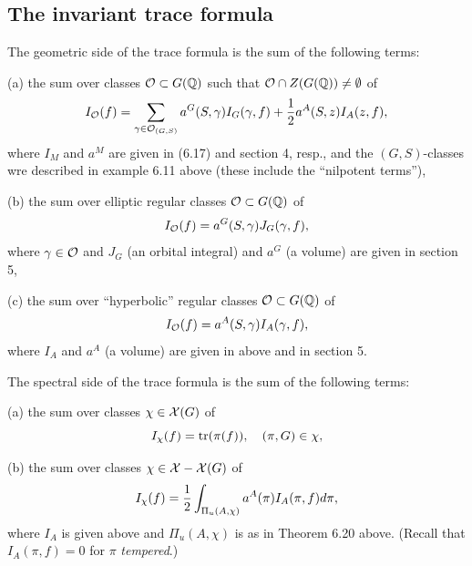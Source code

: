 \subsection{The invariant trace formula}

The geometric side of the trace formula is the sum of the following terms:

(a) the sum over classes ${\cal{O}}\subset G({\mathbb{Q}})$
such that ${\cal{O}}\cap Z(G({\mathbb{Q}}))\not= \emptyset$ of
\begin{equation}
I_{\cal{O}}(f)=\sum_{\gamma\in {\cal{O}}_{(G,S)}}
a^G(S,\gamma)I_G(\gamma,f)+{1\over 2}a^A(S,z)I_A(z,f),
\end{equation}
where $I_M$ and $a^M$ are given in (6.17) and section 4,
resp., and the $(G,S)$-classes wre described in example 6.11
above (these include the ``nilpotent terms''),

(b) the sum over elliptic regular classes 
${\cal{O}}\subset G({\mathbb{Q}})$
of
\begin{equation}
I_{\cal{O}}(f)=
a^G(S,\gamma)J_G(\gamma,f),
\end{equation}
where $\gamma\in {\cal{O}}$ and
$J_G$ (an orbital integral) and $a^G$ (a volume)
are given in section 5,

(c) the sum over ``hyperbolic'' regular classes
${\cal{O}}\subset G({\mathbb{Q}})$
of
\begin{equation}
I_{\cal{O}}(f)=
a^A(S,\gamma)I_A(\gamma,f),
\end{equation}
where $I_A$ and $a^A$ (a volume)
are given in above and in section 5.

The spectral side of the trace formula is the sum of the following terms:

(a) the sum over classes $\chi\in {\cal{X}}(G)$ of
\begin{equation}
I_\chi(f)=
{\rm tr}(\pi(f)),\ \ \ (\pi,G)\in\chi,
\end{equation}

(b) the sum over classes $\chi\in {\cal{X}}-{\cal{X}}(G)$ of
\begin{equation}
I_\chi(f)=
{1\over 2}\int_{\Pi_u(A,\chi)}
a^A(\pi)I_A(\pi,f)d\pi,
\end{equation}
where $I_A$ is given above and $\Pi_u(A,\chi)$ is as in Theorem 6.20
above. (Recall that $I_A(\pi,f)=0$ for $\pi$ {\em tempered}.)



